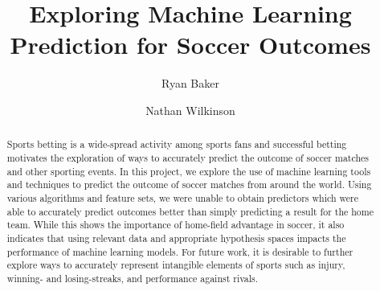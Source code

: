 \documentclass[sigconf, 11pt]{acmart}
\begin{document}
\title{Exploring Machine Learning Prediction for Soccer Outcomes}


\author{Ryan Baker}

\author{Nathan Wilkinson}


\begin{abstract}

Sports betting is a wide-spread activity among sports fans and successful betting motivates the exploration of ways to accurately predict the outcome of soccer matches and other sporting events. In this project, we explore the use of machine learning tools and techniques to predict the outcome of soccer matches from around the world. Using various algorithms and feature sets, we were unable to obtain predictors which were able to accurately predict outcomes better than simply predicting a result for the home team. While this shows the importance of home-field advantage in soccer, it also indicates that using relevant data and appropriate hypothesis spaces impacts the performance of machine learning models. For future work, it is desirable to further explore ways to accurately represent intangible elements of sports such as injury, winning- and losing-streaks, and performance against rivals.
 
\end{abstract}

\maketitle




 
\end{document}

